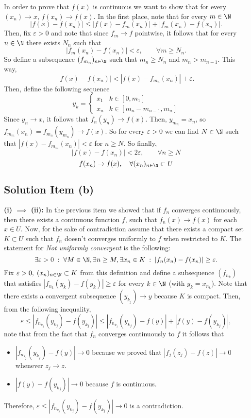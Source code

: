 In order to prove that $f(x)$ is continuous we want to show that for every $(x_n) \to x$, $f(x_n) \to f(x)$. In the first place, note that for every $m\in \N$
\[ |f(x)-f(x_n)| \leq |f(x)- f_{m}(x_n)| + |f_{m}(x_n) - f(x_n)|. \]
Then, fix $\varepsilon > 0$ and note that since $f_m \to f$ pointwise, it follows that for every $n\in \N$ there exists $N_n$ such that
\[ |f_{m}(x_n) - f(x_n)| < \varepsilon,\hspace{2em} \forall m \geq N_n. \]
So define a subsequence $(f_{m_n})_{n\in \N}$ such that $m_n \geq N_n$ and $m_n > m_{n-1}$. This way,
\[  |f(x)-f(x_n)| < |f(x)- f_{m_n}(x_n)| + \varepsilon. \]
Then, define the following sequence
\[ y_k =\begin{cases}
    x_1 & k \in [0,m_1]\\
    x_n & k \in [m_{n}-m_{n-1}, m_n]
\end{cases} \]
Since $y_n \to x$, it follows that $f_n(y_n) \to f(x)$. Then, $y_{m_n} = x_{n}$, so $f_{m_m}(x_n) = f_{m_n}(y_{m_n}) \to f(x)$. So for every $\varepsilon > 0$ we can find $N \in \N$ such that $|f(x)- f_{m_m}(x_n)| < \varepsilon$ for $n \geq N$. So finally,
\[ |f(x)-f(x_n)| < 2 \varepsilon,\hspace{2em}  \forall n \geq N\]
\[ f(x_n) \to f(x),\hspace{1em}  \forall (x_n)_{n\in \N} \subset U \]

\subsection*{Solution Item (b)}

\textbf{(i) $\boldsymbol{\implies}$ (ii):} In the previous item we showed that if $f_n$ converges continuously, then there exists a continuous function $f$, such that $f_n(x) \to f(x)$ for each $x \in U$. Now, for the sake of contradiction assume that there exists a compact set $K \subset U$ such that $f_n$ doesn't converges uniformly to $f$ when restricted to $K$. The statement for \textit{Not uniformly convergent} is the following:
\[ \exists \varepsilon > 0 \;:\; \forall M \in \N, \exists n \geq M, \exists x_n \in K \;:\; |f_n(x_n) - f(x_n)| \geq \varepsilon. \]
Fix $\varepsilon > 0,\; (x_n)_{n\in\N} \subset K$ from this definition and define a subsequence $(f_{n_k})$ that satisfies $|f_{n_k}(y_k) - f(y_k)| \geq \varepsilon$ for every $k \in \N$ (with $y_k = x_{n_k}$). Note that there exists a convergent subsequence $(y_{k_j}) \to y$ because $K$ is compact. Then, from the following inequality,
\[ \varepsilon \leq |f_{n_{k_j}}(y_{k_j}) - f(y_{k_j})| \leq |f_{n_{k_j}}(y_{k_j}) - f(y)| + |f(y) - f(y_{k_j})|, \]
note that from the fact that $f_n$ converges continuously to $f$ it follows that
\begin{itemize}
    \item $|f_{n_{k_j}}(y_{k_j}) - f(y)| \to 0$ because we proved that $|f_j(z_j) - f(z)| \to 0$ whenever $z_j \to z$.
    \item $|f(y) - f(y_{k_j})| \to 0$ because $f$ is continuous.
\end{itemize}
Therefore, $\varepsilon \leq |f_{n_{k_j}}(y_{k_j}) - f(y_{k_j})| \to 0$ is a contradiction.

